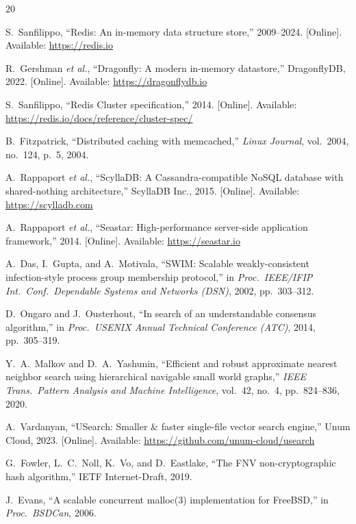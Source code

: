 \documentclass[conference]{IEEEtran}
\begin{document}
\begin{thebibliography}{20}

S.~Sanfilippo, ``Redis: An in-memory data structure store,''
2009--2024. [Online]. Available: \url{https://redis.io}

R.~Gershman \emph{et al.}, ``Dragonfly: A modern in-memory datastore,''
DragonflyDB, 2022. [Online]. Available: \url{https://dragonflydb.io}

S.~Sanfilippo, ``Redis Cluster specification,'' 2014. [Online].
Available: \url{https://redis.io/docs/reference/cluster-spec/}

B.~Fitzpatrick, ``Distributed caching with memcached,''
\emph{Linux Journal}, vol.~2004, no.~124, p.~5, 2004.

A.~Rappaport \emph{et al.}, ``ScyllaDB: A Cassandra-compatible
NoSQL database with shared-nothing architecture,'' ScyllaDB Inc.,
2015. [Online]. Available: \url{https://scylladb.com}

A.~Rappaport \emph{et al.}, ``Seastar: High-performance server-side
application framework,'' 2014. [Online].
Available: \url{https://seastar.io}

A.~Das, I.~Gupta, and A.~Motivala, ``SWIM: Scalable weakly-consistent
infection-style process group membership protocol,'' in \emph{Proc.\
IEEE/IFIP Int.\ Conf.\ Dependable Systems and Networks (DSN)}, 2002,
pp.~303--312.

D.~Ongaro and J.~Ousterhout, ``In search of an understandable consensus
algorithm,'' in \emph{Proc.\ USENIX Annual Technical Conference
(ATC)}, 2014, pp.~305--319.

Y.~A.~Malkov and D.~A.~Yashunin, ``Efficient and robust approximate
nearest neighbor search using hierarchical navigable small world
graphs,'' \emph{IEEE Trans.\ Pattern Analysis and Machine
Intelligence}, vol.~42, no.~4, pp.~824--836, 2020.

A.~Vardanyan, ``USearch: Smaller \& faster single-file vector search
engine,'' Unum Cloud, 2023. [Online].
Available: \url{https://github.com/unum-cloud/usearch}

G.~Fowler, L.~C.~Noll, K.~Vo, and D.~Eastlake, ``The FNV
non-cryptographic hash algorithm,'' IETF Internet-Draft, 2019.

J.~Evans, ``A scalable concurrent malloc(3) implementation for
FreeBSD,'' in \emph{Proc.\ BSDCan}, 2006.


\end{thebibliography}
\end{document}
